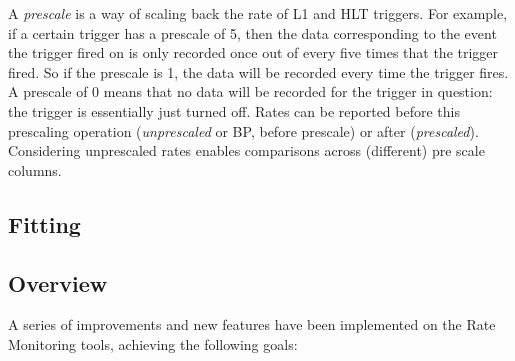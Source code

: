 A \textit{prescale} is a way of scaling back the rate of L1 and HLT triggers. For example, if a certain trigger has a prescale of 5, then the data corresponding to the event the trigger fired on is only recorded once out of every five times that the trigger fired. So if the prescale is 1, the data will be recorded every time the trigger fires. A prescale of 0 means that no data will be recorded for the trigger in question: the trigger is essentially just turned off. Rates can be reported before this prescaling operation (\textit{unprescaled} or BP, before prescale) or after (\textit{prescaled}). Considering unprescaled rates enables comparisons across (different) pre scale columns.

\subsection{Fitting}




\subsection{Overview}

A series of improvements and new features have been implemented on the Rate Monitoring tools, achieving the following goals:

